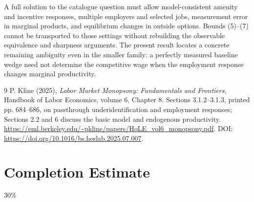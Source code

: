 \documentclass[11pt]{article}
\theoremstyle{remark}
\begin{document}
A full solution to the catalogue question must allow model-consistent
amenity and incentive responses, multiple employers and selected jobs,
measurement error in marginal products, and equilibrium changes in outside
options. Bounds (5)--(7) cannot be transported to those settings without
rebuilding the observable equivalence and sharpness arguments. The present
result locates a concrete remaining ambiguity even in the smaller family:
a perfectly measured baseline wedge need not determine the competitive
wage when the employment response changes marginal productivity.

\begin{thebibliography}{9}
 P. Kline (2025), \emph{Labor Market Monopsony:
Fundamentals and Frontiers}, Handbook of Labor Economics, volume 6,
Chapter 8. Sections 3.1.2--3.1.3, printed pp. 684--686, on passthrough
underidentification and employment responses; Sections 2.2 and 6 discuss
the basic model and endogenous productivity.
\url{https://eml.berkeley.edu/~pkline/papers/HoLE_vol6_monopsony.pdf}.
DOI: \url{https://doi.org/10.1016/bs.heslab.2025.07.007}.
\end{thebibliography}

\section{Completion Estimate}
30\%
\end{document}
